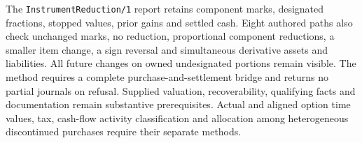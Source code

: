 The \texttt{InstrumentReduction/1} report retains component marks, designated
fractions, stopped values, prior gains and settled cash. Eight authored paths
also check unchanged marks, no reduction, proportional component reductions,
a smaller item change, a sign reversal and simultaneous derivative assets and
liabilities. All future changes on owned undesignated portions remain visible.
The method requires a complete purchase-and-settlement bridge and returns no
partial journals on refusal. Supplied valuation, recoverability, qualifying
facts and documentation remain substantive prerequisites. Actual and aligned
option time values, tax, cash-flow activity classification and allocation among
heterogeneous discontinued purchases require their separate methods.

